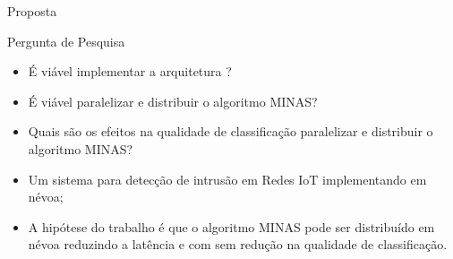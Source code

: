 \documentclass[aspectratio=1610,10pt]{beamer}
\newcommand{\nota}[1]{\hspace*{-0.5cm}\textit{{\color[rgb]{1,0,0}Nota: #1}}}
\begin{document}
\begin{frame}[fragile]{Proposta}
  \begin{block}{Pergunta de Pesquisa}
    \begin{itemize}
      \item É viável implementar a arquitetura \arch?
      \item É viável paralelizar e distribuir o algoritmo MINAS?
      \item Quais são os efeitos na qualidade de classificação paralelizar e
      distribuir o algoritmo MINAS?
      
      \item Um sistema para detecção de intrusão em Redes IoT implementando em névoa;

      \item A hipótese do trabalho é que o algoritmo MINAS pode ser distribuído em
      névoa reduzindo a latência e com sem redução na qualidade de classificação.

    \end{itemize}
  \end{block}
\end{frame}
\end{document}
